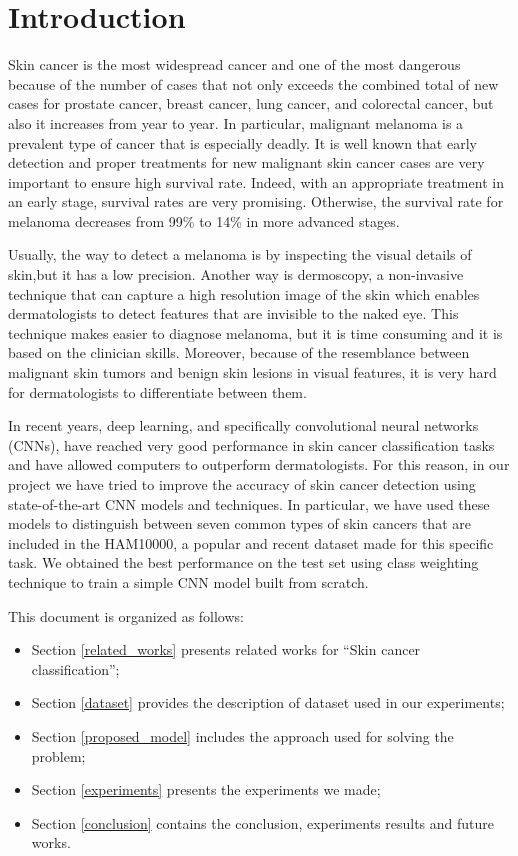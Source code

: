 \section{Introduction} \label{introduction}

	Skin cancer is the most widespread cancer and one of the most dangerous because of the number of cases that not only exceeds the combined total of new cases for prostate cancer, breast cancer, lung cancer, and colorectal cancer, but also it increases from year to year. In particular, malignant melanoma is a prevalent type of cancer that is especially deadly. It is well known that early detection and proper treatments for new malignant skin cancer cases are very important to ensure high survival rate. Indeed, with an appropriate treatment in an early stage, survival rates are very promising. Otherwise, the survival rate for melanoma decreases from 99\% to 14\% in more advanced stages.
	
	\smallskip
	
	Usually, the way to detect a melanoma is by inspecting the visual details of skin,but it has a low precision. Another way is dermoscopy, a non-invasive technique that can capture a high resolution image of the skin which enables dermatologists to detect features that are invisible to the naked eye. This technique makes easier to diagnose melanoma, but it is time consuming and it is based on the clinician skills. Moreover, because of the resemblance between malignant skin tumors and benign skin lesions in visual features, it is very hard for dermatologists to differentiate between them.
	
	\smallskip
	
	In recent years, deep learning, and specifically convolutional neural networks (CNNs), have reached very good performance in skin cancer classification tasks and have allowed computers to outperform dermatologists. For this reason, in our project we have tried to improve the accuracy of skin cancer detection using state-of-the-art CNN models and techniques. In particular, we have used these models to distinguish between seven common types of skin cancers that are included in the HAM10000, a popular and recent dataset made for this specific task. We obtained the best performance on the test set using class weighting technique to train a simple CNN model built from scratch. 
	
	\bigskip
	
	This document is organized as follows:  
	\begin{itemize}
		\item Section \ref{related_works} presents related works for ``Skin cancer classification'';
		\item Section \ref{dataset} provides the description of dataset used in our experiments;
		\item Section \ref{proposed_model} includes the approach used for solving the problem;
		\item Section \ref{experiments} presents the experiments we made;
		\item Section \ref{conclusion} contains the conclusion, experiments results and future works.
	\end{itemize}